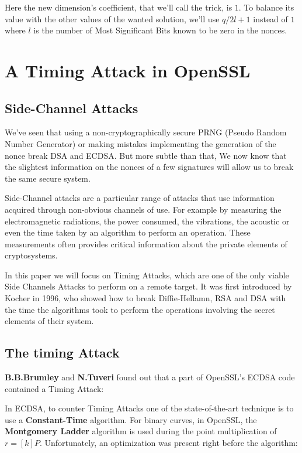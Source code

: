 \documentclass[a4paper,11pt]{article}
\begin{document}
Here the new dimension's coefficient, that we'll call the trick, is $1$. To balance its value with the other values of the wanted solution, we'll use $q / 2{l+1}$ instead of $1$ where $l$ is the number of Most Significant Bits known to be zero in the nonces.


\section{A Timing Attack in OpenSSL}

\subsection{Side-Channel Attacks}

We've seen that using a non-cryptographically secure PRNG (Pseudo Random Number Generator) or making mistakes implementing the generation of the nonce break DSA and ECDSA. But more subtle than that, We now know that the slightest information on the nonces of a few signatures will allow us to break the same secure system.

Side-Channel attacks are a particular range of attacks that use information acquired through non-obvious channels of use. For example by measuring the electromagnetic radiations, the power consumed, the vibrations, the acoustic or even the time taken by an algorithm to perform an operation. These measurements often provides critical information about the private elements of cryptosystems.

In this paper we will focus on Timing Attacks, which are one of the only viable Side Channels Attacks to perform on a remote target. It was first introduced by Kocher in 1996\cite{Kocher}, who showed how to break Diffie-Hellamn, RSA and DSA with the time the algorithms took to perform the operations involving the secret elements of their system.

\subsection{The timing Attack}

\textbf{B.B.Brumley} and \textbf{N.Tuveri} found out\cite{brumley-tuveri} that a part of OpenSSL's ECDSA code contained a Timing Attack:

In ECDSA, to counter Timing Attacks one of the state-of-the-art technique is to use a \textbf{Constant-Time} algorithm. For binary curves, in OpenSSL, the \textbf{Montgomery Ladder} algorithm is used during the point multiplication of $r = [k] P$. Unfortunately, an optimization was present right before the algorithm:
\end{document}
